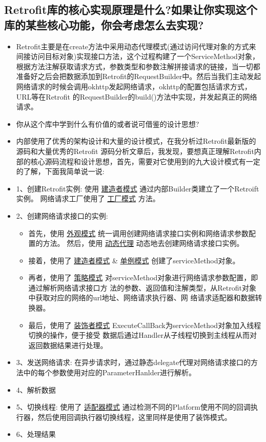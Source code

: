 \documentclass[9pt, b5paper]{article}
\begin{document}
\subsection{Retrofit库的核心实现原理是什么?如果让你实现这个库的某些核心功能，你会考虑怎么去实现?}
\label{sec-3-2}
\begin{itemize}
\item Retrofit主要是在create方法中采用动态代理模式(通过访问代理对象的方式来间接访问目标对象)实现接口方法，这个过程构建了一个ServiceMethod对象，根据方法注解获取请求方式，参数类型和参数注解拼接请求的链接，当一切都准备好之后会把数据添加到Retrofit的RequestBuilder中。然后当我们主动发起网络请求的时候会调用okhttp发起网络请求，okhttp的配置包括请求方式，URL等在Retrofit 的RequestBuilder的build()方法中实现，并发起真正的网络请求。
\item 你从这个库中学到什么有价值的或者说可借鉴的设计思想?
\item 内部使用了优秀的架构设计和大量的设计模式，在我分析过Retrofit最新版的源码和大量优秀的Retrofit 源码分析文章后，我发现，要想真正理解Retrofit内部的核心源码流程和设计思想，首先，需要对它使用到的九大设计模式有一定的了解，下面我简单说一说:
\item 1、创建Retrofit实例: 使用 \uline{建造者模式} 通过内部Builder类建立了一个Retroift实例。 网络请求工厂使用了 \uline{工厂模式} 方法。
\item 2、创建网络请求接口的实例:
\begin{itemize}
\item 首先，使用 \uline{外观模式} 统一调用创建网络请求接口实例和网络请求参数配置的方法。 然后，使用 \uline{动态代理} 动态地去创建网络请求接口实例。
\item 接着，使用了 \uline{建造者模式} \& \uline{单例模式} 创建了serviceMethod对象。
\item 再者，使用了 \uline{策略模式} 对serviceMethod对象进行网络请求参数配置，即通过解析网络请求接口方 法的参数、返回值和注解类型，从Retrofit对象中获取对应的网络的url地址、网络请求执行器、网 络请求适配器和数据转换器。
\item 最后，使用了 \uline{装饰者模式} ExecuteCallBack为serviceMethod对象加入线程切换的操作，便于接受 数据后通过Handler从子线程切换到主线程从而对返回数据结果进行处理。
\end{itemize}
\item 3、发送网络请求: 在异步请求时，通过静态delegate代理对网络请求接口的方法中的每个参数使用对应的ParameterHanlder进行解析。
\item 4、解析数据
\item 5、切换线程: 使用了 \uline{适配器模式} 通过检测不同的Platform使用不同的回调执行器，然后使用回调执行器切换线程，这里同样是使用了装饰模式。
\item 6、处理结果
\end{itemize}
\end{document}
